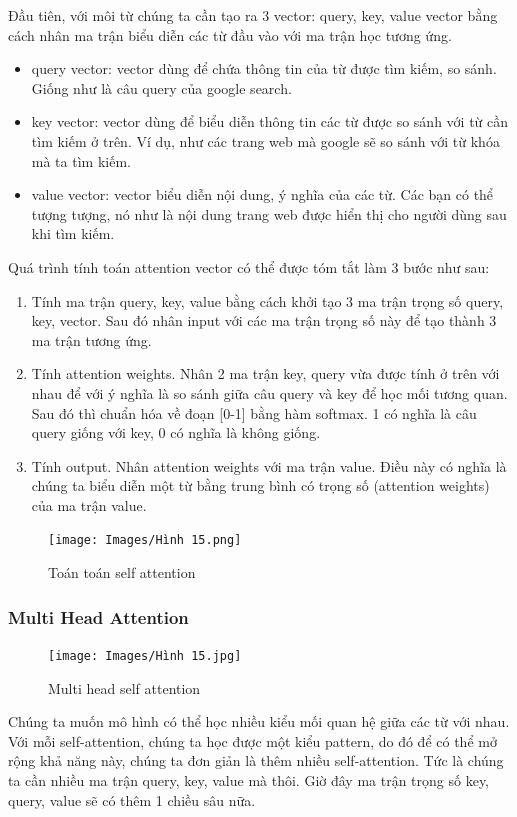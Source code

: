 \documentclass[a4paper]{article}
\theoremstyle{definition}
\begin{document}
Đầu tiên, với môi từ chúng ta cần tạo ra 3 vector: query, key, value vector bằng cách nhân ma trận biểu diễn các từ đầu vào với ma trận học tương ứng.
\begin{itemize}
    \item query vector: vector dùng để chứa thông tin của từ được tìm kiếm, so sánh. Giống như là câu query của google search.
    \item key vector: vector dùng để biểu diễn thông tin các từ được so sánh với từ cần tìm kiếm ở trên. Ví dụ, như các trang web mà google sẽ so sánh với từ khóa mà ta tìm kiếm.
    \item value vector: vector biểu diễn nội dung, ý nghĩa của các từ. Các bạn có thể tượng tượng, nó như là nội dung trang web được hiển thị cho người dùng sau khi tìm kiếm.
\end{itemize}
Quá trình tính toán attention vector có thể được tóm tắt làm 3 bước như sau:
\begin{enumerate}[Bước 1.]

    \item Tính ma trận query, key, value bằng cách khởi tạo 3 ma trận trọng số query, key, vector. Sau đó nhân input với các ma trận trọng số này để tạo thành 3 ma trận tương ứng.

    \item Tính attention weights. Nhân 2 ma trận key, query vừa được tính ở trên với nhau để với ý nghĩa là so sánh giữa câu query và key để học mối tương quan. Sau đó thì chuẩn hóa về đoạn [0-1] bằng hàm softmax. 1 có nghĩa là câu query giống với key, 0 có nghĩa là không giống.

    \item Tính output. Nhân attention weights với ma trận value. Điều này có nghĩa là chúng ta biểu diễn một từ bằng trung bình có trọng số (attention weights) của ma trận value.

\end{enumerate}
\newpage
\begin{figure}[h!]
\begin{center}
\texttt{[image: Images/Hình 15.png]} \\[0.25in]

\caption{Toán toán self attention}
\end{center}
\end{figure}
\subsubsection{Multi Head Attention }
\begin{figure}[h!]
\begin{center}
\texttt{[image: Images/Hình 15.jpg]} \\[0.25in]

\caption{Multi head self attention}
\end{center}
\end{figure}
Chúng ta muốn mô hình có thể học nhiều kiểu mối quan hệ giữa các từ với nhau. Với mỗi self-attention, chúng ta học được một kiểu pattern, do đó để có thể mở rộng khả năng này, chúng ta đơn giản là thêm nhiều self-attention. Tức là chúng ta cần nhiều ma trận query, key, value mà thôi. Giờ đây ma trận trọng số key, query, value sẽ có thêm 1 chiều sâu nữa.
\end{document}
